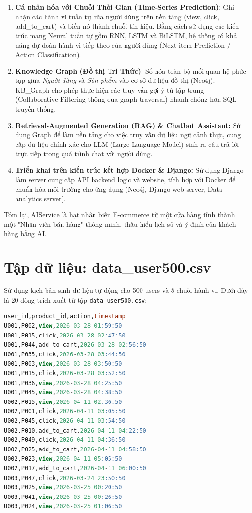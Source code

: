 \documentclass[12pt,a4paper]{article}
\begin{document}
\begin{enumerate}
    \item \textbf{Cá nhân hóa với Chuỗi Thời Gian (Time-Series Prediction):} Ghi nhận các hành vi tuần tự của người dùng trên nền tảng (view, click, add\_to\_cart) và biến nó thành chuỗi tín hiệu. Bằng cách sử dụng các kiến trúc mạng Neural tuần tự gồm RNN, LSTM và BiLSTM, hệ thống có khả năng dự đoán hành vi tiếp theo của người dùng (Next-item Prediction / Action Classification).
    \item \textbf{Knowledge Graph (Đồ thị Tri Thức):} Số hóa toàn bộ mối quan hệ phức tạp giữa \textit{Người dùng} và \textit{Sản phẩm} vào cơ sở dữ liệu đồ thị (Neo4j). KB\_Graph cho phép thực hiện các truy vấn gợi ý từ tập trung (Collaborative Filtering thông qua graph traversal) nhanh chóng hơn SQL truyền thống.
    \item \textbf{Retrieval-Augmented Generation (RAG) \& Chatbot Assistant:} Sử dụng Graph để làm nền tảng cho việc truy vấn dữ liệu ngữ cảnh thực, cung cấp dữ liệu chính xác cho LLM (Large Language Model) sinh ra câu trả lời trực tiếp trong quá trình chat với người dùng.
    \item \textbf{Triển khai trên kiến trúc kết hợp Docker \& Django:} Sử dụng Django làm server cung cấp API backend logic và website, tích hợp với Docker để chuẩn hóa môi trường cho ứng dụng (Neo4j, Django web server, Data analytics server). 
\end{enumerate}

Tóm lại, AIService là hạt nhân biến E-commerce từ một cửa hàng tĩnh thành một "Nhân viên bán hàng" thông minh, thấu hiểu lịch sử và ý định của khách hàng bằng AI.

\section{Tập dữ liệu: data\_user500.csv}

Sử dụng kịch bản sinh dữ liệu tự động cho 500 users và 8 chuỗi hành vi. Dưới đây là 20 dòng trích xuất từ tập \texttt{data\_user500.csv}:

\begin{lstlisting}[language=SQL]
user_id,product_id,action,timestamp
U001,P002,view,2026-03-28 01:59:50
U001,P015,click,2026-03-28 02:47:50
U001,P044,add_to_cart,2026-03-28 02:56:50
U001,P035,click,2026-03-28 03:44:50
U001,P003,view,2026-03-28 03:50:50
U001,P015,click,2026-03-28 03:52:50
U001,P036,view,2026-03-28 04:25:50
U001,P045,view,2026-03-28 04:38:50
U002,P015,view,2026-04-11 02:36:50
U002,P001,click,2026-04-11 03:05:50
U002,P045,click,2026-04-11 03:54:50
U002,P010,add_to_cart,2026-04-11 04:22:50
U002,P049,click,2026-04-11 04:36:50
U002,P025,add_to_cart,2026-04-11 04:58:50
U002,P023,view,2026-04-11 05:05:50
U002,P017,add_to_cart,2026-04-11 06:00:50
U003,P047,click,2026-03-24 23:50:50
U003,P025,view,2026-03-25 00:20:50
U003,P041,view,2026-03-25 00:26:50
U003,P024,view,2026-03-25 01:06:50
\end{lstlisting}
\end{document}
